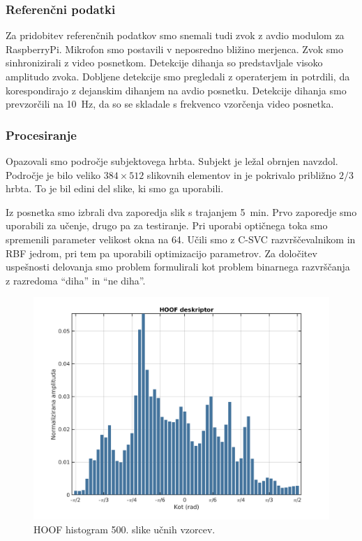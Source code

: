 \subsubsection{Referenčni podatki}
Za pridobitev referenčnih podatkov smo snemali tudi zvok z avdio modulom za RaspberryPi. Mikrofon smo postavili v neposredno bližino merjenca. Zvok smo sinhronizirali z video posnetkom. Detekcije dihanja so predstavljale visoko amplitudo zvoka. Dobljene detekcije smo pregledali z operaterjem in potrdili, da korespondirajo z dejanskim dihanjem na avdio posnetku. Detekcije dihanja smo prevzorčili na \SI{10}{Hz}, da so se skladale s frekvenco vzorčenja video posnetka.

\subsubsection{Procesiranje}\label{sec:data-preprocessing}
Opazovali smo področje subjektovega hrbta. Subjekt je ležal obrnjen navzdol. Področje je bilo veliko $384 \times 512$ slikovnih elementov in je pokrivalo približno $2/3$ hrbta. To je bil edini del slike, ki smo ga uporabili.

Iz posnetka smo izbrali dva zaporedja slik s trajanjem \SI{5}{min}. Prvo zaporedje smo uporabili za učenje, drugo pa za testiranje. Pri uporabi optičnega toka smo spremenili parameter velikost okna na $64$. Učili smo z C-SVC razvrščevalnikom in RBF jedrom, pri tem pa uporabili optimizacijo parametrov. Za določitev uspešnosti delovanja smo problem formulirali kot problem binarnega razvrščanja z razredoma ``diha'' in ``ne diha''.

\begin{figure}[htb]
	\centering
	\includegraphics[width=0.6\columnwidth]{./Slike/breathtest-histogram.png}
	\caption{HOOF histogram 500. slike učnih vzorcev.}
	\label{fig:dihanje-hist}
\end{figure}

